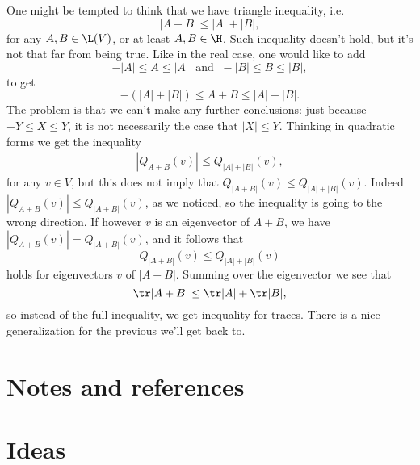 One might be tempted to think that we have triangle inequality, i.e.
\[
	|A + B| \leq |A| + |B|,
\]
for any $A, B \in \L(V)$, or at least $A, B \in \H$. Such inequality doesn't hold, but it's not that far from being true. Like in the real case, one would like to add
\[
	-|A| \leq A \leq |A| \; \text{ and } \; -|B| \leq B \leq |B|,
\]
to get
\[
	-(|A| + |B|) \leq A + B \leq |A| + |B|.
\]
The problem is that we can't make any further conclusions: just because $-Y \leq X \leq Y$, it is not necessarily the case that $|X| \leq Y$. Thinking in quadratic forms we get the inequality
\begin{align}
	|Q_{A + B}(v)| \leq Q_{|A| + |B|}(v),
\end{align}
for any $v \in V$, but this does not imply that $Q_{|A + B|}(v) \leq Q_{|A| + |B|}(v)$. Indeed $|Q_{A + B}(v)| \leq Q_{|A + B|}(v)$, as we noticed, so the inequality is going to the wrong direction. If however $v$ is an eigenvector of $A + B$, we have $|Q_{A + B}(v)| = Q_{|A + B|}(v)$, and it follows that
\[
	Q_{|A + B|}(v) \leq Q_{|A| + |B|}(v)
\]
holds for eigenvectors $v$ of $|A + B|$. Summing over the eigenvector we see that
\[
	\tr|A + B| \leq \tr |A| + \tr |B|,
\]
so instead of the full inequality, we get inequality for traces. There is a nice generalization for the previous we'll get back to.

\section{Notes and references}

\section{Ideas}

